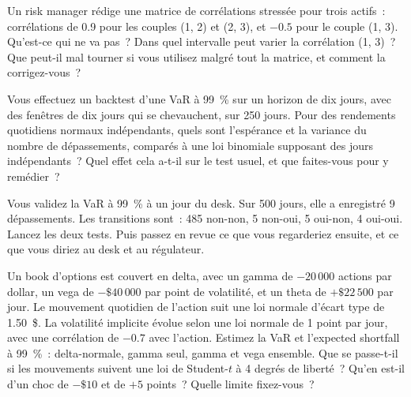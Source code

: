 \begin{question}\label{iq:iv2:risk-validation-and-regulation:36}
Un risk manager rédige une matrice de corrélations stressée pour trois actifs~: corrélations de 0.9 pour les couples (1, 2) et (2, 3), et $-0.5$ pour le couple (1, 3). Qu'est-ce qui ne va pas~? Dans quel intervalle peut varier la corrélation (1, 3)~? Que peut-il mal tourner si vous utilisez malgré tout la matrice, et comment la corrigez-vous~?
\end{question}

\begin{question}\label{iq:iv2:risk-validation-and-regulation:37}
Vous effectuez un backtest d'une VaR à 99~\% sur un horizon de dix jours, avec des fenêtres de dix jours qui se chevauchent, sur 250 jours. Pour des rendements quotidiens normaux indépendants, quels sont l'espérance et la variance du nombre de dépassements, comparés à une loi binomiale supposant des jours indépendants~? Quel effet cela a-t-il sur le test usuel, et que faites-vous pour y remédier~?
\end{question}

\begin{question}\label{iq:iv2:risk-validation-and-regulation:38}
Vous validez la VaR à 99~\% à un jour du desk. Sur 500 jours, elle a enregistré 9 dépassements. Les transitions sont~: 485 non-non, 5 non-oui, 5 oui-non, 4 oui-oui. Lancez les deux tests. Puis passez en revue ce que vous regarderiez ensuite, et ce que vous diriez au desk et au régulateur.
\end{question}

\begin{question}\label{iq:iv2:risk-validation-and-regulation:39}
Un book d'options est couvert en delta, avec un gamma de $-20\,000$ actions par dollar, un vega de $-\$40\,000$ par point de volatilité, et un theta de $+\$22\,500$ par jour. Le mouvement quotidien de l'action suit une loi normale d'écart type de 1.50~\$. La volatilité implicite évolue selon une loi normale de 1 point par jour, avec une corrélation de $-0.7$ avec l'action. Estimez la VaR et l'expected shortfall à 99~\%~: delta-normale, gamma seul, gamma et vega ensemble. Que se passe-t-il si les mouvements suivent une loi de Student-$t$ à 4 degrés de liberté~? Qu'en est-il d'un choc de $-\$10$ et de $+5$ points~? Quelle limite fixez-vous~?
\end{question}

